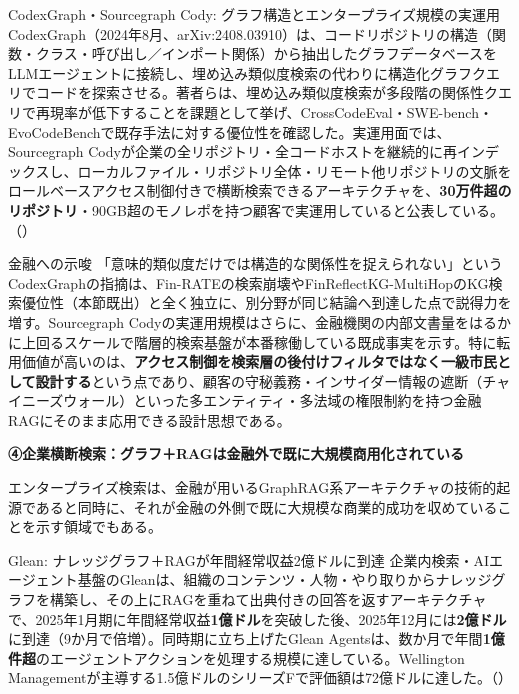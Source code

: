 \begin{casestudy}{CodexGraph・Sourcegraph Cody: グラフ構造とエンタープライズ規模の実運用}
CodexGraph（2024年8月、arXiv:2408.03910）は、コードリポジトリの構造（関数・クラス・呼び出し／インポート関係）から抽出したグラフデータベースをLLMエージェントに接続し、埋め込み類似度検索の代わりに構造化グラフクエリでコードを探索させる。著者らは、埋め込み類似度検索が多段階の関係性クエリで再現率が低下することを課題として挙げ、CrossCodeEval・SWE-bench・EvoCodeBenchで既存手法に対する優位性を確認した。実運用面では、Sourcegraph Codyが企業の全リポジトリ・全コードホストを継続的に再インデックスし、ローカルファイル・リポジトリ全体・リモート他リポジトリの文脈をロールベースアクセス制御付きで横断検索できるアーキテクチャを、\textbf{30万件超のリポジトリ}・90GB超のモノレポを持つ顧客で実運用していると公表している。（\cite{y02codexgraph2024,y02sourcegraphcody2024}）
\end{casestudy}

\begin{insight}{金融への示唆}
「意味的類似度だけでは構造的な関係性を捉えられない」というCodexGraphの指摘は、Fin-RATEの検索崩壊やFinReflectKG-MultiHopのKG検索優位性（本節既出）と全く独立に、別分野が同じ結論へ到達した点で説得力を増す。Sourcegraph Codyの実運用規模はさらに、金融機関の内部文書量をはるかに上回るスケールで階層的検索基盤が本番稼働している既成事実を示す。特に転用価値が高いのは、\textbf{アクセス制御を検索層の後付けフィルタではなく一級市民として設計する}という点であり、顧客の守秘義務・インサイダー情報の遮断（チャイニーズウォール）といった多エンティティ・多法域の権限制約を持つ金融RAGにそのまま応用できる設計思想である。
\end{insight}

\textbf{④企業横断検索：グラフ＋RAGは金融外で既に大規模商用化されている}

エンタープライズ検索は、金融が用いるGraphRAG系アーキテクチャの技術的起源であると同時に、それが金融の外側で既に大規模な商業的成功を収めていることを示す領域でもある。

\begin{casestudy}{Glean: ナレッジグラフ＋RAGが年間経常収益2億ドルに到達}
企業内検索・AIエージェント基盤のGleanは、組織のコンテンツ・人物・やり取りからナレッジグラフを構築し、その上にRAGを重ねて出典付きの回答を返すアーキテクチャで、2025年1月期に年間経常収益\textbf{1億ドル}を突破した後、2025年12月には\textbf{2億ドル}に到達（9か月で倍増）。同時期に立ち上げたGlean Agentsは、数か月で年間\textbf{1億件超}のエージェントアクションを処理する規模に達している。Wellington Managementが主導する1.5億ドルのシリーズFで評価額は72億ドルに達した。（\cite{y02glean2025}）
\end{casestudy}

